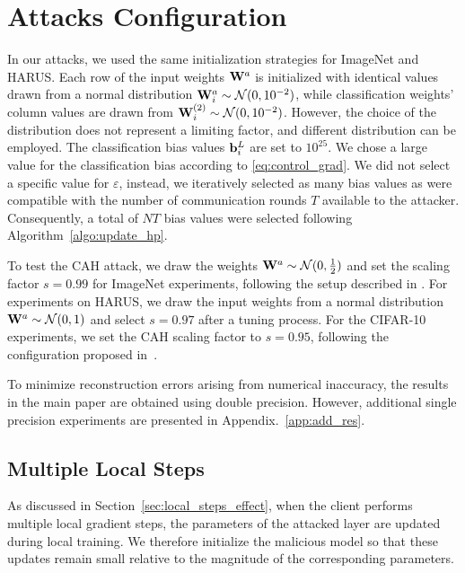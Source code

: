 \section{Attacks Configuration}\label{app:model_init}
In our attacks, we used the same initialization strategies for ImageNet and HARUS. Each row of the input weights $\mathbf{W}^{a}$ is initialized with identical values drawn from a normal distribution $\mathbf{W}^{a}_i \sim\mathcal{N}(0, 10^{-2})$, while classification weights' column values are drawn from $\mathbf{W}_i^{(2)} \sim \mathcal{N}(0, 10^{-2})$. However, the choice of the distribution does not represent a limiting factor, and different distribution can be employed. The classification bias values ${\mathbf{b}}^{L}_i$ are set to $10^{25}$. We chose a large value for the classification bias according to \eqref{eq:control_grad}. We did not select a specific value for $\varepsilon$, instead, we iteratively selected as many bias values as were compatible with the number of communication rounds $T$ available to the attacker. Consequently, a total of $NT$ bias values were selected following Algorithm~\ref{algo:update_hp}.


To test the CAH attack, we draw the weights $\mathbf{W}^{a} \sim \mathcal{N}(0, \frac{1}{2})$ and set the scaling factor $s=0.99$ for ImageNet experiments, following the setup described in . For experiments on HARUS, we draw the input weights from a normal distribution $\mathbf{W}^{a} \sim \mathcal{N}(0, 1)$ and select $s=0.97$ after a tuning process. For the CIFAR-10 experiments, we set the CAH scaling factor to $s=0.95$, following the configuration proposed in~.

To minimize reconstruction errors arising from numerical inaccuracy, the results in the main paper are obtained using double precision. However, additional single precision experiments are presented in Appendix.~\ref{app:add_res}.
\subsection{Multiple Local Steps}
\label{par:local_steps}

As discussed in Section~\ref{sec:local_steps_effect}, when the client performs multiple local gradient steps, the parameters of the attacked layer are updated during local training. We therefore initialize the malicious model so that these updates remain small relative to the magnitude of the corresponding parameters.

